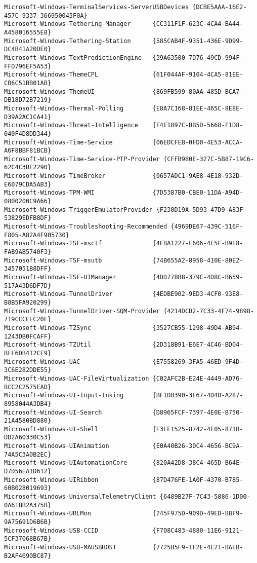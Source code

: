 \documentclass{report}
\begin{document}
\begin{lstlisting}[breaklines=true,basicstyle=\tiny]
Microsoft-Windows-TerminalServices-ServerUSBDevices {DCBE5AAA-16E2-457C-9337-366950045F0A}
Microsoft-Windows-Tethering-Manager      {CC311F1F-623C-4CA4-BA44-A458016555E8}
Microsoft-Windows-Tethering-Station      {585CAB4F-9351-436E-9D99-DC4B41A20DE0}
Microsoft-Windows-TextPredictionEngine   {39A63500-7D76-49CD-994F-FFD796EF5A53}
Microsoft-Windows-ThemeCPL               {61F044AF-9104-4CA5-81EE-CB6C51BB01AB}
Microsoft-Windows-ThemeUI                {869FB599-80AA-485D-BCA7-DB18D72B7219}
Microsoft-Windows-Thermal-Polling        {E8A7C168-81EE-465C-8E8E-D39A2AC1CA41}
Microsoft-Windows-Threat-Intelligence    {F4E1897C-BB5D-5668-F1D8-040F4D8DD344}
Microsoft-Windows-Time-Service           {06EDCFEB-0FD0-4E53-ACCA-A6F8BBF81BCB}
Microsoft-Windows-Time-Service-PTP-Provider {CFFB980E-327C-5B87-19C6-62C4C3BE2290}
Microsoft-Windows-TimeBroker             {0657ADC1-9AE8-4E18-932D-E6079CDA5AB3}
Microsoft-Windows-TPM-WMI                {7D5387B0-CBE0-11DA-A94D-0800200C9A66}
Microsoft-Windows-TriggerEmulatorProvider {F230D19A-5D93-47D9-A83F-53829EDFB8DF}
Microsoft-Windows-Troubleshooting-Recommended {4969DE67-439C-516F-F805-A82A4F905730}
Microsoft-Windows-TSF-msctf              {4FBA1227-F606-4E5F-B9E8-FAB9AB5740F3}
Microsoft-Windows-TSF-msutb              {74B655A2-8958-410E-80E2-3457051B8DFF}
Microsoft-Windows-TSF-UIManager          {4DD778B8-379C-4D8C-B659-517A43D6DF7D}
Microsoft-Windows-TunnelDriver           {4EDBE902-9ED3-4CF0-93E8-B8B5FA920299}
Microsoft-Windows-TunnelDriver-SQM-Provider {4214DCD2-7C33-4F74-9898-719CCCEEC20F}
Microsoft-Windows-TZSync                 {3527CB55-1298-49D4-AB94-1243DB0FCAFF}
Microsoft-Windows-TZUtil                 {2D318B91-E6E7-4C46-BD04-BFE6DB412CF9}
Microsoft-Windows-UAC                    {E7558269-3FA5-46ED-9F4D-3C6E282DDE55}
Microsoft-Windows-UAC-FileVirtualization {C02AFC2B-E24E-4449-AD76-BCC2C2575EAD}
Microsoft-Windows-UI-Input-Inking        {BF1DB390-3E67-4D4D-A287-8958044A3DB4}
Microsoft-Windows-UI-Search              {D8965FCF-7397-4E0E-B750-21A4580BD880}
Microsoft-Windows-UI-Shell               {E3EE1525-8742-4E05-871B-DD2A60330C53}
Microsoft-Windows-UIAnimation            {E0A40B26-30C4-4656-BC9A-74A5C3A0B2EC}
Microsoft-Windows-UIAutomationCore       {820A42D8-38C4-465D-B64E-D7D56EA1D612}
Microsoft-Windows-UIRibbon               {87D476FE-1A0F-4370-B785-60B028019693}
Microsoft-Windows-UniversalTelemetryClient {6489B27F-7C43-5886-1D00-0A61BB2A375B}
Microsoft-Windows-URLMon                 {245F975D-909D-49ED-B8F9-9A75691D6B6B}
Microsoft-Windows-USB-CCID               {F708C483-4880-11E6-9121-5CF37068B67B}
Microsoft-Windows-USB-MAUSBHOST          {7725B5F9-1F2E-4E21-BAEB-B2AF4690BC87}

\end{lstlisting}
\end{document}
